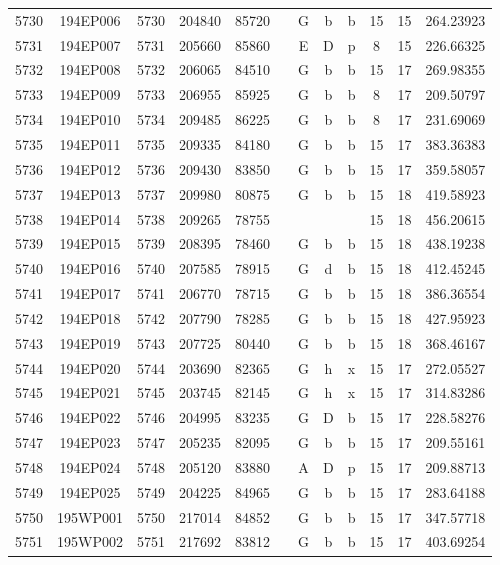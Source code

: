 \begin{tabular}{|*{12}{c|}}
5730 & 194EP006 & 5730 & 204840 & 85720 &  & G & b & b & 15 & 15 & 264.23923 \\ 
5731 & 194EP007 & 5731 & 205660 & 85860 &  & E & D & p & 8 & 15 & 226.66325 \\ 
5732 & 194EP008 & 5732 & 206065 & 84510 &  & G & b & b & 15 & 17 & 269.98355 \\ 
5733 & 194EP009 & 5733 & 206955 & 85925 &  & G & b & b & 8 & 17 & 209.50797 \\ 
5734 & 194EP010 & 5734 & 209485 & 86225 &  & G & b & b & 8 & 17 & 231.69069 \\ 
5735 & 194EP011 & 5735 & 209335 & 84180 &  & G & b & b & 15 & 17 & 383.36383 \\ 
5736 & 194EP012 & 5736 & 209430 & 83850 &  & G & b & b & 15 & 17 & 359.58057 \\ 
5737 & 194EP013 & 5737 & 209980 & 80875 &  & G & b & b & 15 & 18 & 419.58923 \\ 
5738 & 194EP014 & 5738 & 209265 & 78755 &  &  &  &  & 15 & 18 & 456.20615 \\ 
5739 & 194EP015 & 5739 & 208395 & 78460 &  & G & b & b & 15 & 18 & 438.19238 \\ 
5740 & 194EP016 & 5740 & 207585 & 78915 &  & G & d & b & 15 & 18 & 412.45245 \\ 
5741 & 194EP017 & 5741 & 206770 & 78715 &  & G & b & b & 15 & 18 & 386.36554 \\ 
5742 & 194EP018 & 5742 & 207790 & 78285 &  & G & b & b & 15 & 18 & 427.95923 \\ 
5743 & 194EP019 & 5743 & 207725 & 80440 &  & G & b & b & 15 & 18 & 368.46167 \\ 
5744 & 194EP020 & 5744 & 203690 & 82365 &  & G & h & x & 15 & 17 & 272.05527 \\ 
5745 & 194EP021 & 5745 & 203745 & 82145 &  & G & h & x & 15 & 17 & 314.83286 \\ 
5746 & 194EP022 & 5746 & 204995 & 83235 &  & G & D & b & 15 & 17 & 228.58276 \\ 
5747 & 194EP023 & 5747 & 205235 & 82095 &  & G & b & b & 15 & 17 & 209.55161 \\ 
5748 & 194EP024 & 5748 & 205120 & 83880 &  & A & D & p & 15 & 17 & 209.88713 \\ 
5749 & 194EP025 & 5749 & 204225 & 84965 &  & G & b & b & 15 & 17 & 283.64188 \\ 
5750 & 195WP001 & 5750 & 217014 & 84852 &  & G & b & b & 15 & 17 & 347.57718 \\ 
5751 & 195WP002 & 5751 & 217692 & 83812 &  & G & b & b & 15 & 17 & 403.69254 \\ 

\end{tabular}
